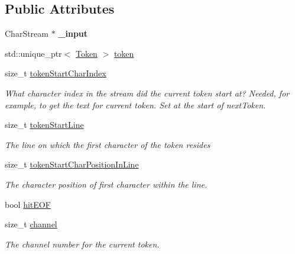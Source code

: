 \subsection*{Public Attributes}
\begin{DoxyCompactItemize}
\item 
\mbox{\label{classantlr4_1_1Lexer_a9907b8bfbc53eb4a959055f9f670b475}} 
Char\+Stream $\ast$ {\bfseries \+\_\+input}
\item 
std\+::unique\+\_\+ptr$<$ \hyperlink{classantlr4_1_1Token}{Token} $>$ \hyperlink{classantlr4_1_1Lexer_aadde3dc45a759a8704d694cfc12fd3f0}{token}
\item 
size\+\_\+t \hyperlink{classantlr4_1_1Lexer_a48b49fec871804e5c18d6c6a68f25b97}{token\+Start\+Char\+Index}
\begin{DoxyCompactList}\small\item\em What character index in the stream did the current token start at? Needed, for example, to get the text for current token. Set at the start of next\+Token. \end{DoxyCompactList}\item 
size\+\_\+t \hyperlink{classantlr4_1_1Lexer_a1bef23fbfd7830dd7c526a2e016709e0}{token\+Start\+Line}
\begin{DoxyCompactList}\small\item\em The line on which the first character of the token resides \end{DoxyCompactList}\item 
\mbox{\label{classantlr4_1_1Lexer_abd3f217385676a651a46251ef77e2dd0}} 
size\+\_\+t \hyperlink{classantlr4_1_1Lexer_abd3f217385676a651a46251ef77e2dd0}{token\+Start\+Char\+Position\+In\+Line}
\begin{DoxyCompactList}\small\item\em The character position of first character within the line. \end{DoxyCompactList}\item 
bool \hyperlink{classantlr4_1_1Lexer_a29874dfe31fab456324eef3af1fa529c}{hit\+E\+OF}
\item 
\mbox{\label{classantlr4_1_1Lexer_a66bdd313cab31be61169b1995eac7629}} 
size\+\_\+t \hyperlink{classantlr4_1_1Lexer_a66bdd313cab31be61169b1995eac7629}{channel}
\begin{DoxyCompactList}\small\item\em The channel number for the current token. \end{DoxyCompactList}\item 

\end{DoxyCompactItemize}

